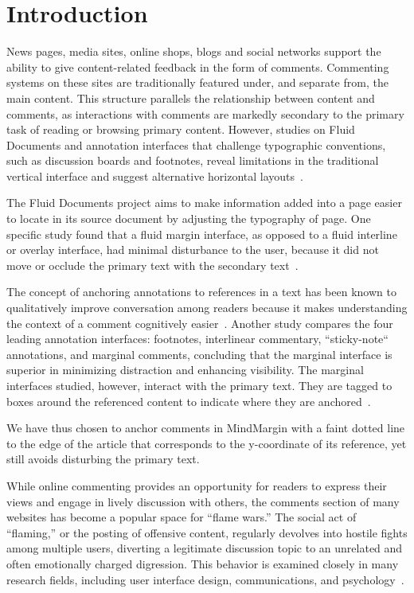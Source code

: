 \section{Introduction}

News pages, media sites, online shops, blogs and social networks support the ability to give content-related feedback in the form of comments. Commenting systems on these sites are traditionally featured under, and separate from, the main content. This structure parallels the relationship between content and comments, as interactions with comments are markedly secondary to the primary task of reading or browsing primary content. However, studies on Fluid Documents and annotation interfaces that challenge typographic conventions, such as discussion boards and footnotes, reveal limitations in the traditional vertical interface and suggest alternative horizontal layouts~\cite{FluidDocs,NewsInterfaces,NB,AnnotationsStudents,Brush,Guzdial,van}. 

The Fluid Documents project aims to make information added into a page easier to locate in its source document by adjusting the typography of page. One specific study found that a fluid margin interface, as opposed to a fluid interline or overlay interface, had minimal disturbance to the user, because it did not move or occlude the primary text with the secondary text~\cite{FluidDocs}. 

The concept of anchoring annotations to references in a text has been known to qualitatively improve conversation among readers because it makes understanding the context of a comment cognitively easier~\cite{Brush,Guzdial,van}. Another study compares the four leading annotation interfaces: footnotes, interlinear commentary, ``sticky-note`` annotations, and marginal comments, concluding that the marginal interface is superior in minimizing distraction and enhancing visibility. The marginal interfaces studied, however, interact with the primary text. They are tagged to boxes around the referenced content to indicate where they are anchored~\cite{AnnotationsStudents}. 

We have thus chosen to anchor comments in MindMargin with a faint dotted line to the edge of the article that corresponds to the y-coordinate of its reference, yet still avoids disturbing the primary text.

While online commenting provides an opportunity for readers to express their views and engage in lively discussion with others, the comments section of many websites has become a popular space for “flame wars.” The social act of “flaming,” or the posting of offensive content, regularly devolves into hostile fights among multiple users, diverting a legitimate discussion topic to an unrelated and often emotionally charged digression. This behavior is examined closely in many research fields, including user interface design, communications, and psychology~\cite{FlamingComp,FlamingPsych,FlamingSoftware,FlamingCommunications}. 

